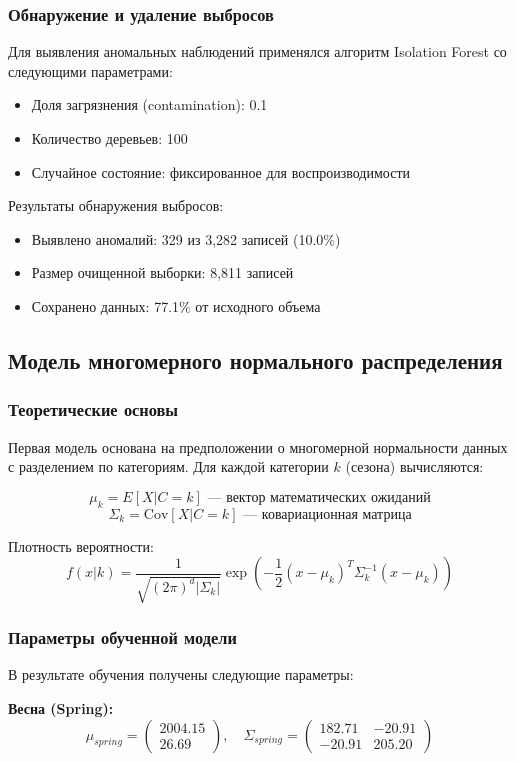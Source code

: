 \documentclass[12pt, a4paper]{article}
\begin{document}
\subsubsection{Обнаружение и удаление выбросов}
Для выявления аномальных наблюдений применялся алгоритм Isolation Forest со следующими параметрами:
\begin{itemize}
    \item Доля загрязнения (contamination): 0.1
    \item Количество деревьев: 100
    \item Случайное состояние: фиксированное для воспроизводимости
\end{itemize}

Результаты обнаружения выбросов:
\begin{itemize}
    \item Выявлено аномалий: 329 из 3,282 записей (10.0\%)
    \item Размер очищенной выборки: 8,811 записей
    \item Сохранено данных: 77.1\% от исходного объема
\end{itemize}

\subsection{Модель многомерного нормального распределения}
\subsubsection{Теоретические основы}
Первая модель основана на предположении о многомерной нормальности данных с разделением по категориям. Для каждой категории $k$ (сезона) вычисляются:

\[ \mu_k = E[X|C=k] \text{ --- вектор математических ожиданий} \]
\[ \Sigma_k = \text{Cov}[X|C=k] \text{ --- ковариационная матрица} \]

Плотность вероятности:
\[ f(x|k) = \frac{1}{\sqrt{(2\pi)^d |\Sigma_k|}} \exp\left(-\frac{1}{2} (x - \mu_k)^T \Sigma_k^{-1} (x - \mu_k)\right) \]

\subsubsection{Параметры обученной модели}
В результате обучения получены следующие параметры:

\textbf{Весна (Spring):}
\[ \mu_{spring} = \begin{pmatrix} 2004.15 \\ 26.69 \end{pmatrix}, \quad \Sigma_{spring} = \begin{pmatrix} 182.71 & -20.91 \\ -20.91 & 205.20 \end{pmatrix} \]
\end{document}
